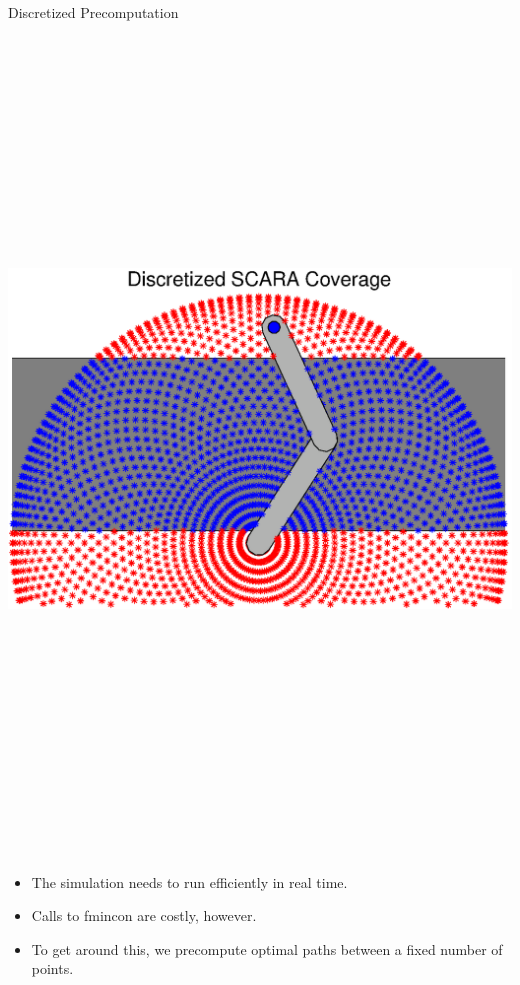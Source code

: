 \documentclass[final]{beamer}
\begin{document}
\begin{frame}{}
{\begin{columns}[t]
\begin{column}{.30\linewidth}
\begin{block}{\centering Discretized Precomputation}
\centering\includegraphics[height=22cm, width = 26cm]{figures/SCARA_coverage.eps}\\

\begin{itemize}

	\item The simulation needs to run efficiently in real time.
	\item Calls to fmincon are costly, however.
	\item To get around this, we precompute optimal paths between a fixed number of points.

\end{itemize}


\end{block}
\end{column}
\end{columns}}
\end{frame}
\end{document}
